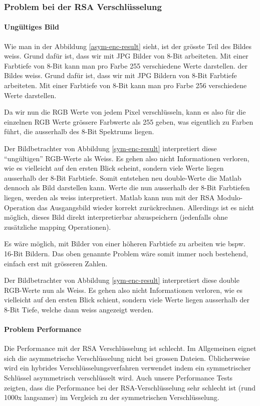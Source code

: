 \documentclass[paper=a4,fontsize=12pt]{scrartcl}
\begin{document}
\subsubsection{Problem bei der RSA Verschlüsselung} \label{problems-RSA}
\paragraph{Ungültiges Bild} \label{problem-white}
Wie man in der Abbildung \ref{asym-enc-result} sieht, ist der grösste Teil
des Bildes weiss.
Grund dafür ist, dass wir mit JPG Bilder von 8-Bit arbeiteten.
Mit einer Farbtiefe von 8-Bit kann man pro Farbe 255 verschiedene Werte darstellen.
der Bildes weiss.
Grund dafür ist, dass wir mit JPG Bildern von 8-Bit Farbtiefe arbeiteten.
Mit einer Farbtiefe von 8-Bit kann man pro Farbe 256 verschiedene Werte darstellen.

Da wir nun die RGB Werte von jedem Pixel verschlüsseln, kann es also für die einzelnen
RGB Werte grössere Farbwerte als 255 geben, was eigentlich zu Farben führt,
die ausserhalb des 8-Bit Spektrums liegen.

Der Bildbetrachter von Abbildung \ref{sym-enc-result} interpretiert diese "`ungültigen"'
RGB-Werte als Weiss. 
Es gehen also nicht Informationen verloren, wie es vielleicht auf den ersten Blick scheint,
sondern viele Werte liegen ausserhalb der 8-Bit Farbtiefe.
Somit entstehen neu double-Werte die Matlab dennoch als Bild darstellen kann. Werte die nun 
ausserhalb der 8-Bit Farbtiefen liegen, werden als weiss interpretiert.
Matlab kann nun mit der RSA Modulo-Operation das Ausgangsbild wieder korrekt zurückrechnen. 
Allerdings ist es nicht möglich, dieses Bild direkt interpretierbar abzuspeichern 
(jedenfalls ohne zusätzliche mapping Operationen).

Es wäre möglich, mit Bilder von einer höheren Farbtiefe zu arbeiten wie bspw. 16-Bit Bildern.
Das oben genannte Problem wäre somit immer noch bestehend, einfach erst mit grösseren Zahlen.

Der Bildbetrachter von Abbildung \ref{sym-enc-result} interpretiert diese double 
RGB-Werte nun als Weiss. 
Es gehen also nicht Informationen verloren, wie es vielleicht auf den ersten Blick schient,
sondern viele Werte liegen ausserhalb der 8-Bit Tiefe, welche dann weiss angezeigt werden.

\paragraph{Problem Performance} Die Performance mit der RSA Verschlüsselung ist schlecht.
Im Allgemeinen eignet sich die asymmetrische Verschlüsselung nicht bei grossen Dateien.
Üblicherweise wird ein hybrides Verschlüsselungsverfahren verwendet indem
ein symmetrischer Schlüssel asymmetrisch verschlüsselt wird.
Auch unsere Performance Tests zeigten, dass die Performance bei der RSA-Verschlüsselung
sehr schlecht ist (rund 1000x langsamer) im Vergleich zu der symmetrischen Verschlüsselung.
\end{document}
